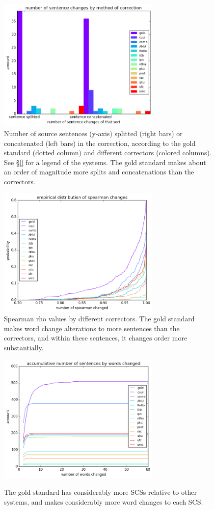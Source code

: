 \documentclass[english]{article}
\begin{document}
\begin{figure}
	\includegraphics[width = 8cm]{aligned}
	\caption{Number of source sentences (y-axis) splitted (right bars) or concatenated (left bars) in the correction,
          according to
          the gold standard (dotted column) and different correctors (colored columns). See \S\ref{} for a legend
          of the systems. The gold standard makes about an order of magnitude more splits and
          concatenations than the correctors.}
	\label{fig:split}
\end{figure}

\begin{figure}
	\includegraphics[width = 8cm]{spearman_ecdf}
	\caption{Spearman rho values by different correctors.
          The gold standard makes word change alterations to more sentences than the correctors,
          and within these sentences, it changes order more substantially.}
	\label{fig:rho}
\end{figure}

\begin{figure}
	\includegraphics[width = 8cm]{words_differences}
	\label{fig:words_changed}
        \caption{The gold standard has considerably more SCSs relative to other systems,
          and makes considerably more word changes to each SCS.}
\end{figure}
\end{document}
